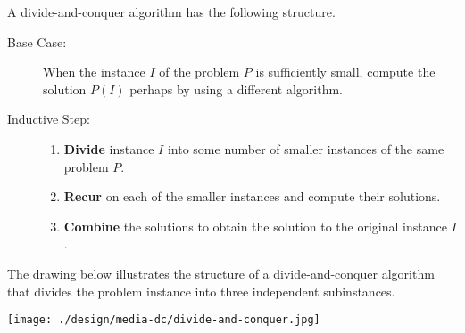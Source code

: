 \begin{flex}
\label{grp:def:design::dc::divide-and-conquer-algorithm}

\begin{definition}
\label{def:design::dc::divide-and-conquer-algorithm}
A divide-and-conquer algorithm has the following structure.
\begin{description}
\item[Base Case:] When the instance $I$ of the problem $P$ is
  sufficiently small, compute the solution $P(I)$ perhaps by using a
  different algorithm.

\item[Inductive Step:]\mbox{}
\begin{enumerate}
\item {\bf Divide} instance $I$ into some number of 
smaller instances of the same problem $P$.
\item {\bf Recur} on each of the smaller instances and compute
  their solutions.
\item {\bf Combine} the solutions to obtain the solution to the
  original instance $I$.
\end{enumerate}
\end{description}

\end{definition}

\begin{example}
\label{xmpl:design::dc::drawing}
The drawing below illustrates the structure of a divide-and-conquer
algorithm that divides the problem instance into three independent
subinstances.

\begin{center}
\texttt{[image: ./design/media-dc/divide-and-conquer.jpg]}
\end{center}

\end{example}
\end{flex}

